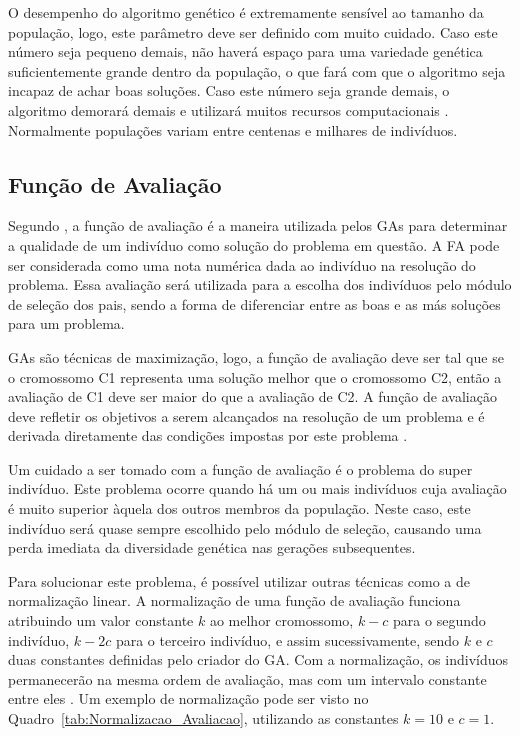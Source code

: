 \documentclass[12pt,oneside,a4paper,english,french,spanish,brazil,]{abntex2}
\begin{document}
O desempenho do algoritmo genético é extremamente sensível ao tamanho da população, logo, este parâmetro deve ser definido com muito cuidado. Caso este número seja pequeno demais, não haverá espaço para uma variedade genética suficientemente grande dentro da população, o que fará com que o algoritmo seja incapaz de achar boas soluções. Caso este número seja grande demais, o algoritmo demorará demais e utilizará muitos recursos computacionais  \cite{linden:2008}. Normalmente populações variam entre centenas e milhares de indivíduos.

\subsection{Função de Avaliação}
\label{sec:Funcao_de_Avaliacao}

Segundo \citet{linden:2008}, a função de avaliação é a maneira utilizada pelos GAs para determinar a qualidade de um indivíduo como solução do problema em questão. A FA pode ser considerada como uma nota numérica dada ao indivíduo na resolução do problema. Essa avaliação será utilizada para a escolha dos indivíduos pelo módulo de seleção dos pais, sendo a forma de diferenciar entre as boas e as más soluções para um problema.

GAs são técnicas de maximização, logo, a função de avaliação deve ser tal que se o cromossomo C1 representa uma solução melhor que o cromossomo C2, então a avaliação de C1 deve ser maior do que a avaliação de C2. A função de avaliação deve refletir os objetivos a serem alcançados na resolução de um problema e é derivada diretamente das condições impostas por este problema \cite{holland:1992}.

Um cuidado a ser tomado com a função de avaliação é o problema do super indivíduo. Este problema ocorre quando há um ou mais indivíduos cuja avaliação é muito superior àquela dos outros membros da população. Neste caso, este indivíduo será quase sempre escolhido pelo módulo de seleção, causando uma perda imediata da diversidade genética nas gerações subsequentes.

Para solucionar este problema, é possível utilizar outras técnicas como a de normalização linear. A normalização de uma função de avaliação funciona atribuindo um valor constante \(k\) ao melhor cromossomo, \(k - c\) para o segundo indivíduo, \(k - 2c\) para o terceiro indivíduo, e assim sucessivamente, sendo \(k\) e \(c\) duas constantes definidas pelo criador do GA. Com a normalização, os indivíduos permanecerão na mesma ordem de avaliação, mas com um intervalo constante entre eles  \cite{linden:2008}. Um exemplo de normalização pode ser visto no Quadro~\ref{tab:Normalizacao_Avaliacao}, utilizando as constantes \(k = 10\) e \(c = 1\).
\end{document}
